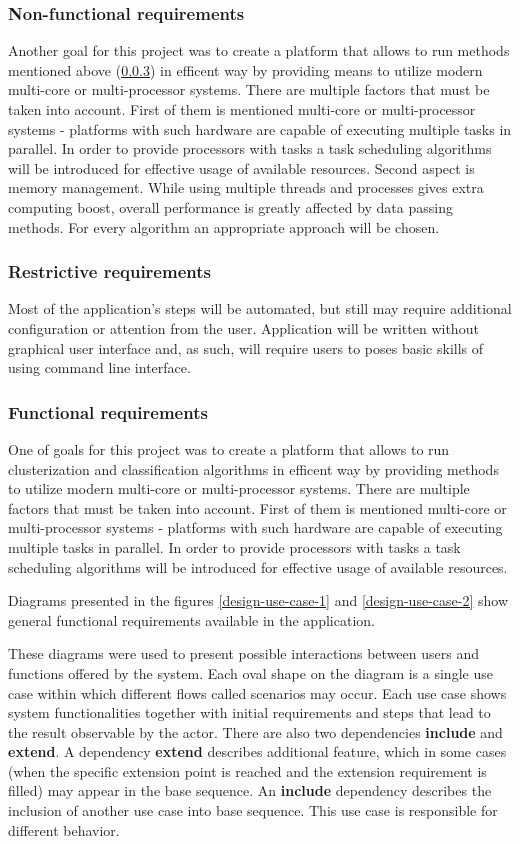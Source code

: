\subsubsection{Non-functional requirements}
Another goal for this project was to create a platform that allows to run methods mentioned above (\ref{design-functional}) in efficent way by providing means to utilize modern multi-core or multi-processor systems. There are multiple factors that must be taken into account. First of them is mentioned multi-core or multi-processor systems - platforms with such hardware are capable of executing multiple tasks in parallel. In order to provide processors with tasks a task scheduling algorithms will be introduced for effective usage of available resources. Second aspect is memory management. While using multiple threads and processes gives extra computing boost, overall performance is greatly affected by data passing methods. For every algorithm an appropriate approach will be chosen.

\subsubsection{Restrictive requirements}
Most of the application's steps will be automated, but still may require additional configuration or attention from the user. Application will be written without graphical user interface and, as such, will require users to poses basic skills of using command line interface. 


\subsubsection{Functional requirements} \label{design-functional}
One of goals for this project was to create a platform that allows to run clusterization and classification algorithms in efficent way by providing methods to utilize modern multi-core or multi-processor systems. There are multiple factors that must be taken into account. First of them is mentioned multi-core or multi-processor systems - platforms with such hardware are capable of executing multiple tasks in parallel. In order to provide processors with tasks a task scheduling algorithms will be introduced for effective usage of available resources.  

Diagrams presented in the figures \ref{design-use-case-1} and  \ref{design-use-case-2} show general functional requirements available in the application. 

These diagrams were used to present possible interactions between users and functions offered by the system.
Each oval shape on the diagram is a single use case within which different flows called scenarios may occur. Each use case shows system functionalities together with initial requirements and steps that lead to the result observable by the actor. There are also two dependencies \textbf{include} and \textbf{extend}. A dependency \textbf{extend} describes additional feature, which in some cases (when the specific extension point is reached and the extension requirement is filled) may appear in the base sequence. 
An \textbf{include} dependency describes the inclusion of another use case into base sequence. This use case is responsible for different behavior. 


